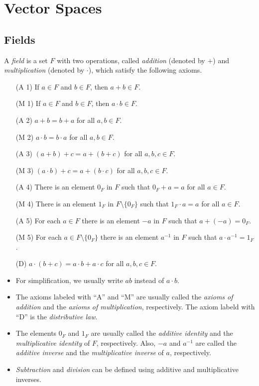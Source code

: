 \chapter{Vector Spaces}
\section{Fields}
\begin{definition}\label{def:field}
  A \emph{field} is a set $F$ with two operations, called \emph{addition}
  (denoted by $+$) and \emph{multiplication} (denoted by $\cdot$), which
  satisfy the following axioms.
  \begin{enumerate}[leftmargin=3.5em]
    \item[(A 1)] If $a \in F$ and $b \in F$, then $a + b \in F$.
    \item[(M 1)] If $a \in F$ and $b \in F$, then $a \cdot b \in F$.
    \item[(A 2)] $a + b = b + a$ for all $a, b \in F$.
    \item[(M 2)] $a \cdot b = b \cdot a$ for all $a, b \in F$.
    \item[(A 3)] $(a + b) + c = a + (b + c)$ for all $a, b, c \in F$.
    \item[(M 3)] $(a \cdot b) + c = a + (b \cdot c)$ for all $a, b, c \in F$.
    \item[(A 4)] There is an element $0_F$ in $F$ such that $0_F + a = a$ for
      all $a \in F$.
    \item[(M 4)] There is an element $1_F$ in $F \setminus \{0_F\}$ such that
      $1_F \cdot a = a$ for all $a \in F$.
    \item[(A 5)] For each $a \in F$ there is an element $-a$ in $F$ such that
      $a + (-a) = 0_F$.
    \item[(M 5)] For each $a \in F \setminus \{0_F\}$ there is an element
      $a^{-1}$ in $F$ such that $a \cdot a^{-1} = 1_F$.
    \item[(D)] $a \cdot (b + c) = a \cdot b + a \cdot c$ for all
      $a, b, c \in F$.
  \end{enumerate}
\end{definition}
\begin{remark} \leavevmode
  \begin{itemize}
    \item For simplification, we usually write $ab$ instead of $a \cdot b$.
    \item The axioms labeled with ``A'' and ``M'' are usually called the
      \emph{axioms of addition} and the \emph{axioms of multiplication},
      respectively. The axiom labeld with ``D'' is the \emph{distributive law}.
    \item The elements $0_F$ and $1_F$ are usually called the
      \emph{additive identity} and the \emph{multiplicative identity} of $F$,
      respectively.
      Also, $-a$ and $a^{-1}$ are called the \emph{additive inverse} and the
      \emph{multiplicative inverse} of $a$, respectively.
    \item \emph{Subtraction} and \emph{division} can be defined using additive
      and multiplicative inverses.
  \end{itemize}
\end{remark}

